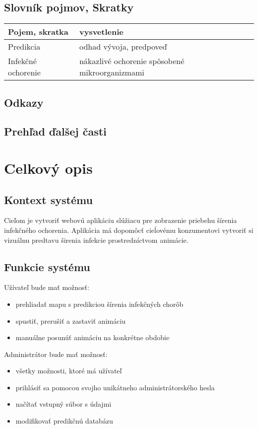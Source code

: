 \documentclass[12pt,a4paper]{report}
\begin{document}
\section[Slovník pojmov, Skratky]{\rmfamily\bfseries
	Slovník pojmov, Skratky}	
\begin{table}[h!]
	\centering
	\begin{tabular}{|>{\centering\arraybackslash}m{1in}|>{\centering\arraybackslash}m{1in}|}
		\hline
		\centering Pojem, skratka & vysvetlenie \\ [0ex]
		\hline
		Predikcia & odhad vývoja, predpoveď \\ [0ex]
		\hline
		Infekčné ochorenie & nákazlivé ochorenie spôsobené mikroorganizmami \\ [0ex]
		\hline
	\end{tabular}
\end{table}
\section[Odkazy]{\rmfamily\bfseries
	Odkazy}

\section[Prehľad ďalšej časti]{\rmfamily\bfseries
	Prehľad ďalšej časti}


\renewcommand{\chaptername}{}	
\chapter[Celkový opis]{\rmfamily\bfseries
	Celkový opis}

\section[Kontext systému]{\rmfamily\bfseries
	Kontext systému}
	Cieľom je vytvoriť webovú aplikáciu slúžiacu pre zobrazenie priebehu šírenia infekčného ochorenia. Aplikácia má dopomôcť cieĺovému konzumentovi vytvoriť si vizuálnu predtavu širenia infekcie prostredníctvom animácie.

\section[Funkcie systému]{\rmfamily\bfseries
	Funkcie systému}
Užívateľ bude mať možnosť:
\begin{itemize}
	\item prehliadať mapu s predikciou šírenia infekčných chorôb	
	\item spustiť, prerušiť a zastaviť animáciu
	\item manuálne posunúť animáciu na konkrétne obdobie
\end{itemize}
Administrátor bude mať možnosť:
\begin{itemize}
	\item všetky možnosti, ktoré má užívateľ 
	\item prihlásiť sa pomocou svojho unikátneho administrátorského hesla
	\item načítať vstupný súbor s údajmi
	\item modifikovať predikčnú databázu
\end{itemize}
\end{document}
